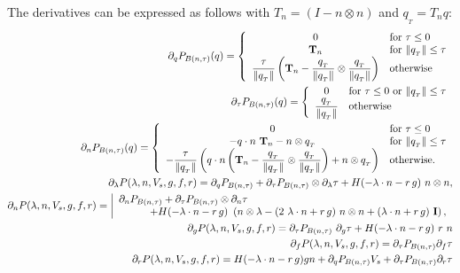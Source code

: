 \documentclass[a4paper,11pt,english]{sphinxmanual}
\begin{document}
\begin{itemize}
The derivatives can be expressed as follows with \(T_n = (I - n \otimes n)\) and \(q_{_T} = T_n q\):
\begin{align*}\!\begin{aligned}
\partial_q P_{B(n,\tau)}(q) =
\left\{\begin{array}{cl}
0 & \mbox{for } \tau \le 0 \\
\mathbf{T}_n & \mbox{for } \|q_{_T}\| \le \tau \\
\dfrac{\tau}{\|q_{_T}\|}
\left(\mathbf{T}_n - \dfrac{q_{_T}}{\|q_{_T}\|}\otimes \dfrac{q_{_T}}{\|q_{_T}\|}
\right) & \mbox{otherwise }
\end{array} \right.\\
\partial_{\tau} P_{B(n,\tau)}(q) =
\left\{\begin{array}{cl}
0 & \mbox{for } \tau \le 0 \mbox{ or } \|q_{_T}\| \le \tau \\
\dfrac{q_{_T}}{\|q_{_T}\|} & \mbox{otherwise}
\end{array} \right.\\
\partial_n P_{B(n,\tau)}(q) =
\left\{
\begin{array}{cl}
0 & \mbox{for } \tau \le 0 \\
-q \cdot n~\mathbf{T}_n - n \otimes q_{_T}
& \mbox{for } \|q_{_T}\| \le \tau \\
-\dfrac{\tau}{\|q_{_T}\|}
\left( q \cdot n
\left(\mathbf{T}_n - \dfrac{q_{_T}}{\|q_{_T}\|}\otimes \dfrac{q_{_T}}{\|q_{_T}\|}
\right)
+ n \otimes q_{_T}
\right) & \mbox{otherwise.}
\end{array} \right.\\
\partial_{\lambda} P(\lambda, n, V_s, g, f, r) = \partial_q P_{B(n,\tau)}
+\partial_{\tau}P_{B(n,\tau)} \otimes  \partial_{\lambda} \tau
+H(-\lambda\cdot n - r\,g)~n \otimes n,\\
\partial_{n} P(\lambda, n, V_s, g, f, r) =
\left|\begin{array}{l} \partial_n P_{B(n,\tau)}
+\partial_{\tau} P_{B(n,\tau)} \otimes \partial_n \tau \\
\hspace*{3em}+H(-\lambda\cdot n - r\,g) ~
\left(n \otimes \lambda -
(2~\lambda\cdot n + r\,g)~n \otimes n +
(\lambda\cdot n + r\,g)~\mathbf{I}\right),
\end{array}\right.\\
\partial_{g} P(\lambda, n, V_s, g, f, r) =
\partial_{\tau} P_{B(n,\tau)} ~ \partial_g \tau
+H(-\lambda\cdot n - r\,g)~r~n\\
\partial_{f} P(\lambda, n, V_s, g, f, r) =
\partial_{\tau} P_{B(n,\tau)} \partial_{f} \tau\\
\partial_{r} P(\lambda, n, V_s, g, f, r) =
 H(-\lambda\cdot n - r\,g)gn + \partial_q P_{B(n,\tau)}V_s
 +\partial_{\tau} P_{B(n,\tau)} \partial_r \tau\\
\end{aligned}\end{align*}
\end{itemize}
\end{document}
